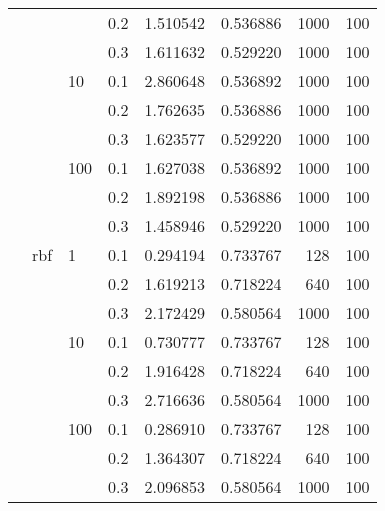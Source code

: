 \begin{table}[H]
\begin{tabular}{llllrrrr}
           &     &     & 0.2 &  1.510542 &  0.536886 &    1000 &   100 \\
           &     &     & 0.3 &  1.611632 &  0.529220 &    1000 &   100 \\
           &     & 10  & 0.1 &  2.860648 &  0.536892 &    1000 &   100 \\
           &     &     & 0.2 &  1.762635 &  0.536886 &    1000 &   100 \\
           &     &     & 0.3 &  1.623577 &  0.529220 &    1000 &   100 \\
           &     & 100 & 0.1 &  1.627038 &  0.536892 &    1000 &   100 \\
           &     &     & 0.2 &  1.892198 &  0.536886 &    1000 &   100 \\
           &     &     & 0.3 &  1.458946 &  0.529220 &    1000 &   100 \\
           & rbf & 1   & 0.1 &  0.294194 &  0.733767 &     128 &   100 \\
           &     &     & 0.2 &  1.619213 &  0.718224 &     640 &   100 \\
           &     &     & 0.3 &  2.172429 &  0.580564 &    1000 &   100 \\
           &     & 10  & 0.1 &  0.730777 &  0.733767 &     128 &   100 \\
           &     &     & 0.2 &  1.916428 &  0.718224 &     640 &   100 \\
           &     &     & 0.3 &  2.716636 &  0.580564 &    1000 &   100 \\
           &     & 100 & 0.1 &  0.286910 &  0.733767 &     128 &   100 \\
           &     &     & 0.2 &  1.364307 &  0.718224 &     640 &   100 \\
           &     &     & 0.3 &  2.096853 &  0.580564 &    1000 &   100 \\
\bottomrule
\end{tabular}
\end{table}
